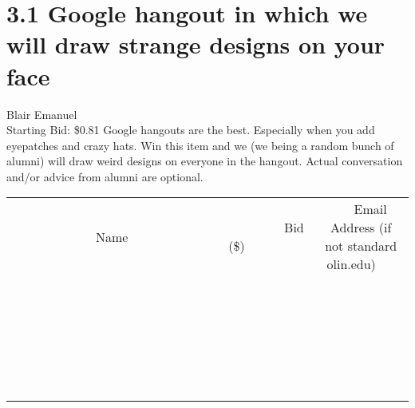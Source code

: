 \documentclass[11pt]{article}
\begin{document}
\section*{3.1 Google hangout in which we will draw strange designs on your face}
Blair Emanuel
\\
Starting Bid: \$0.81
\newline
Google hangouts are the best. Especially when you add eyepatches and crazy hats. Win this item and we (we being a random bunch of alumni) will draw weird designs on everyone in the hangout. Actual conversation and/or advice from alumni are optional.
\\[6ex]
\begin{tabular}{c c c}
~~~~~~~~~~~~~Name~~~~~~~~~~~~~ & ~~~~~~~~~Bid (\$)~~~~~~~~~  & ~~~Email Address (if not standard olin.edu)~~~\\
 & & \\
\hline
 & & \\
\hline
 & & \\
\hline
 & & \\
\hline
 & & \\
\hline
 & & \\
\hline
 & & \\
\hline
 & & \\
\hline
 & & \\
\hline
 & & \\
\hline
 & & \\
\hline
 & & \\
\hline
 & & \\
\hline
 & & \\
\hline
 & & \\
\hline
 & & \\
\hline
 & & \\
\hline
 & & \\
\hline
 & & \\
\hline
 & & \\
\hline
 & & \\
\hline
 & & \\
\hline
 & & \\
\hline
 & & \\
\hline
 & & \\
\hline
 & & \\
\hline
\end{tabular}
\newpage
\end{document}

